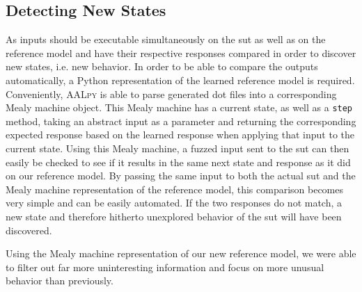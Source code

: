 \subsection{Detecting New States} \label{subsec:state_detect}
As inputs should be executable simultaneously on the \ac{sut} as well as on the reference model and have their respective responses compared in order to discover new states, i.e. new behavior. In order to be able to compare the outputs automatically, a Python representation of the learned reference model is required. Conveniently, \textsc{AALpy} is able to parse generated dot files into a corresponding Mealy machine object. This Mealy machine has a current state, as well as a \texttt{step} method, taking an abstract input as a parameter and returning the corresponding expected response based on the learned response when applying that input to the current state. Using this Mealy machine, a fuzzed input sent to the \ac{sut} can then easily be checked to see if it results in the same next state and response as it did on our reference model. By passing the same input to both the actual \ac{sut} and the Mealy machine representation of the reference model, this comparison becomes very simple and can be easily automated. If the two responses do not match, a new state and therefore hitherto unexplored behavior of the \ac{sut} will have been discovered. 

Using the Mealy machine representation of our new reference model, we were able to filter out far more uninteresting information and focus on more unusual behavior than previously. 

